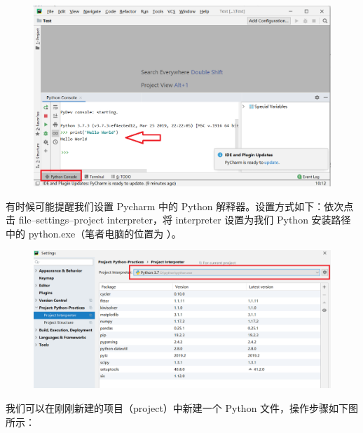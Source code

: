 \clearpage

\begin{figure}[!ht]
  \centering
  \includegraphics[scale=0.4]{figure/chapter1/pycharm4.png}
\end{figure}

有时候可能提醒我们设置 Pycharm 中的 Python 解释器。设置方式如下：依次点击 file--settings--project interpreter，将 interpreter 设置为我们 Python 安装路径中的 python.exe（笔者电脑的位置为 ）。

\begin{figure}[!ht]
  \centering
  \includegraphics[scale=0.4]{figure/chapter1/pycharm3.png}
\end{figure}

我们可以在刚刚新建的项目（project）中新建一个 Python 文件，操作步骤如下图所示：

